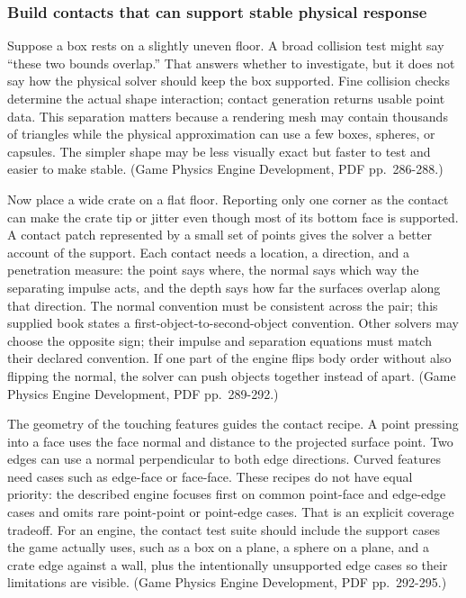 \subsubsection{Build contacts that can support stable physical response}\label{build-contacts-that-can-support-stable-physical-response}

Suppose a box rests on a slightly uneven floor. A broad collision test might say ``these two bounds overlap.'' That answers whether to investigate, but it does not say how the physical solver should keep the box supported. Fine collision checks determine the actual shape interaction; contact generation returns usable point data. This separation matters because a rendering mesh may contain thousands of triangles while the physical approximation can use a few boxes, spheres, or capsules. The simpler shape may be less visually exact but faster to test and easier to make stable. (Game Physics Engine Development, PDF pp.~286-288.)

Now place a wide crate on a flat floor. Reporting only one corner as the contact can make the crate tip or jitter even though most of its bottom face is supported. A contact patch represented by a small set of points gives the solver a better account of the support. Each contact needs a location, a direction, and a penetration measure: the point says where, the normal says which way the separating impulse acts, and the depth says how far the surfaces overlap along that direction. The normal convention must be consistent across the pair; this supplied book states a first-object-to-second-object convention. Other solvers may choose the opposite sign; their impulse and separation equations must match their declared convention. If one part of the engine flips body order without also flipping the normal, the solver can push objects together instead of apart. (Game Physics Engine Development, PDF pp.~289-292.)

The geometry of the touching features guides the contact recipe. A point pressing into a face uses the face normal and distance to the projected surface point. Two edges can use a normal perpendicular to both edge directions. Curved features need cases such as edge-face or face-face. These recipes do not have equal priority: the described engine focuses first on common point-face and edge-edge cases and omits rare point-point or point-edge cases. That is an explicit coverage tradeoff. For an engine, the contact test suite should include the support cases the game actually uses, such as a box on a plane, a sphere on a plane, and a crate edge against a wall, plus the intentionally unsupported edge cases so their limitations are visible. (Game Physics Engine Development, PDF pp.~292-295.)


